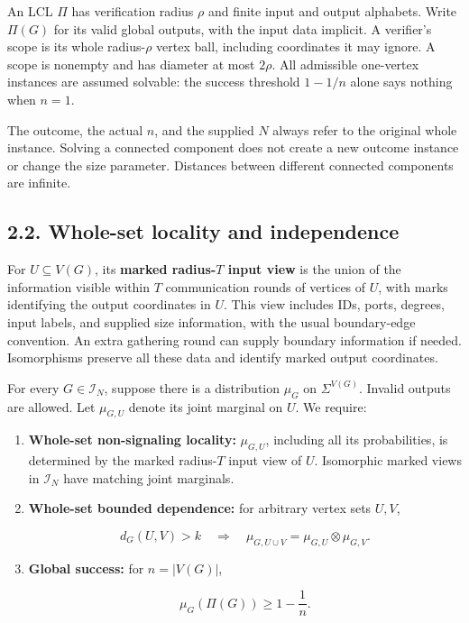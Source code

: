 \documentclass[11pt,a4paper]{article}
\begin{document}
An LCL \(\Pi\) has verification radius \(\rho\) and finite input and output alphabets.
Write \(\Pi(G)\) for its valid global outputs, with the input data implicit.
A verifier's scope is its whole radius-\(\rho\) vertex ball, including coordinates it may ignore.
A scope is nonempty and has diameter at most \(2\rho\).
All admissible one-vertex instances are assumed solvable: the success threshold \(1-1/n\) alone says nothing when \(n=1\).

The outcome, the actual \(n\), and the supplied \(N\) always refer to the original whole instance.
Solving a connected component does not create a new outcome instance or change the size parameter.
Distances between different connected components are infinite.

\subsection{2.2. Whole-set locality and independence}\label{whole-set-locality-and-independence}

For \(U\subseteq V(G)\), its \textbf{marked radius-\(T\) input view} is the union of the information visible within \(T\) communication rounds of vertices of \(U\), with marks identifying the output coordinates in \(U\).
This view includes IDs, ports, degrees, input labels, and supplied size information, with the usual boundary-edge convention.
An extra gathering round can supply boundary information if needed.
Isomorphisms preserve all these data and identify marked output coordinates.

For every \(G\in\mathcal I_N\), suppose there is a distribution \(\mu_G\) on \(\Sigma^{V(G)}\).
Invalid outputs are allowed.
Let \(\mu_{G,U}\) denote its joint marginal on \(U\).
We require:

\begin{enumerate}
\def\labelenumi{\arabic{enumi}.}
\item \textbf{Whole-set non-signaling locality:} \(\mu_{G,U}\), including all its probabilities, is determined by the marked radius-\(T\) input view of \(U\).
Isomorphic marked views in \(\mathcal I_N\) have matching joint marginals.
\item \textbf{Whole-set bounded dependence:} for arbitrary vertex sets \(U,V\),

\[ d_G(U,V)>k\quad\Longrightarrow\quad \mu_{G,U\cup V}=\mu_{G,U}\otimes\mu_{G,V}. \]
\item \textbf{Global success:} for \(n=|V(G)|\),

\[ \mu_G(\Pi(G))\ge 1-\frac1n. \]
\end{enumerate}
\end{document}
